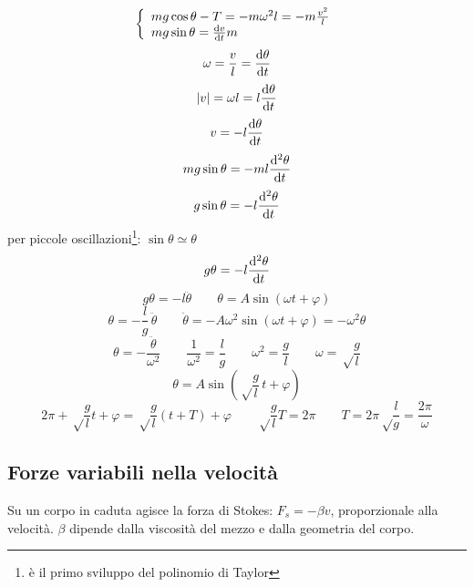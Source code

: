 \begin{equation*}\left\{
  \begin{array}{l}
  mg\cos\theta-T=-m\omega^2l=-m\frac{v^2}{l}\\
  mg\sin\theta=\frac{\mathrm{d} v}{\mathrm{d} t}m
  \end{array}
  \right.\end{equation*}
\begin{equation*}\omega=\frac{v}{l}=\frac{\mathrm{d}\theta}{\mathrm{d} t}\end{equation*}
\begin{equation*}|v|=\omega l=l\frac{\mathrm{d}\theta}{\mathrm{d} t}\end{equation*}
\begin{equation*}v=-l\frac{\mathrm{d}\theta}{\mathrm{d} t}\end{equation*}
\begin{equation*}mg\sin\theta=-ml\frac{\mathrm{d}^2\theta}{\mathrm{d} t}\end{equation*}
\begin{equation*}g\sin\theta=-l\frac{\mathrm{d}^2\theta}{\mathrm{d} t}\end{equation*}
per piccole oscillazioni\footnote{è il primo sviluppo del polinomio di Taylor}: $\sin\theta\simeq\theta$
\begin{equation*}g\theta=-l\frac{\mathrm{d}^2\theta}{\mathrm{d} t}\end{equation*}
$$g\theta=-l\ddot\theta\qquad \theta=A\sin\left(\omega
t+\varphi\right)$$
$$\theta=-\frac{l}{g}\,\ddot\theta\qquad\ddot\theta=-A\omega^2\sin\left(\omega
t+\varphi\right)=-\omega^2\theta$$
\begin{equation*}\theta=-\frac{\ddot\theta}{\omega^2}\qquad \frac{1}{\omega^2}=\frac{l}{g}\qquad\omega^2=\frac{g}{l}\qquad\omega=\sqrt\frac{g}{l}\end{equation*}
\begin{equation*}\theta=A\sin\left(\sqrt\frac{g}{l}\,t+\varphi\right)\end{equation*}
$$2\pi+\sqrt\frac{g}{l}t+\varphi=\sqrt\frac{g}{l}(t+T)+\varphi\qquad
\sqrt\frac{g}{l}T=2\pi\qquad
T=2\pi\sqrt\frac{l}{g}=\frac{2\pi}{\omega}$$

\subsection{Forze variabili nella velocità}
Su un corpo in caduta agisce la forza di Stokes: $F_s=-\beta v$,
proporzionale alla velocità. $\beta$ dipende dalla viscosità del
mezzo e dalla geometria del corpo.

